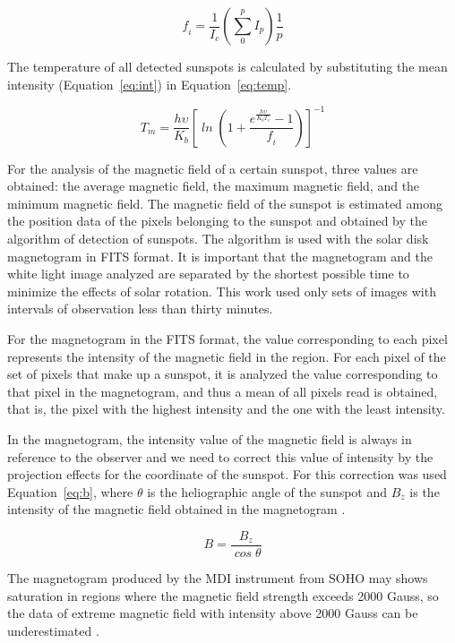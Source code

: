 \documentclass[namedreferences]{solarphysics}
\begin{document}
\begin{article}
\begin{equation} \label{eq:int}
    \mathit{f_{i} = \frac{1}{I_{c}} \left (  \sum_{0}^{p} I_{p} \right )\frac{1}{p}}
\end{equation}

The temperature of all detected sunspots is calculated by substituting the mean intensity (Equation~\ref{eq:int}) in Equation~\ref{eq:temp}.

\begin{equation} \label{eq:temp}
    \mathit{T_{m} = \frac{h\upsilon}{K_{b}} \left [\ln\left ( 1 + \frac{e^{\frac{h\upsilon}{K_{b}T_{c}}} - 1}{f_{i}} \right ) \right ]^{-1}}
\end{equation}

For the analysis of the magnetic field of a certain sunspot, three values are obtained: the average magnetic field,
the maximum magnetic field, and the minimum magnetic field.
The magnetic field of the sunspot is estimated among the position data of the pixels belonging to the sunspot and obtained by the algorithm of detection of sunspots.
The algorithm is used with the solar disk magnetogram in FITS format. 
It is important that the magnetogram and the white light image analyzed are separated by the shortest possible time to minimize the effects of solar rotation.
This work used only sets of images with intervals of observation less than thirty minutes.

For the magnetogram in the FITS format, the value corresponding to each pixel represents the intensity of the magnetic field in the region.
For each pixel of the set of pixels that make up a sunspot,
it is analyzed the value corresponding to that pixel in the magnetogram,
and thus a mean of all pixels read is obtained, that is, the pixel with the highest intensity and the one with the least intensity.

In the magnetogram, the intensity value of the magnetic field is always in reference to the observer and we need to correct this value of intensity by the projection effects for the coordinate of the sunspot.
For this correction was used Equation~\ref{eq:b}, where $\theta$ is the heliographic angle of the sunspot and $B_z$ is the intensity of the magnetic field obtained in the magnetogram \citep{borrero2011}.

\begin{equation} \label{eq:b}
    \mathit{B = \frac{B_z}{\cos\theta}}
\end{equation}

The magnetogram produced by the MDI instrument from SOHO may shows saturation in regions where the magnetic field strength exceeds 2000 Gauss,
so the data of extreme magnetic field with intensity above 2000 Gauss can be underestimated \citep{selhorst2008}.
    

\end{article}
\end{document}
